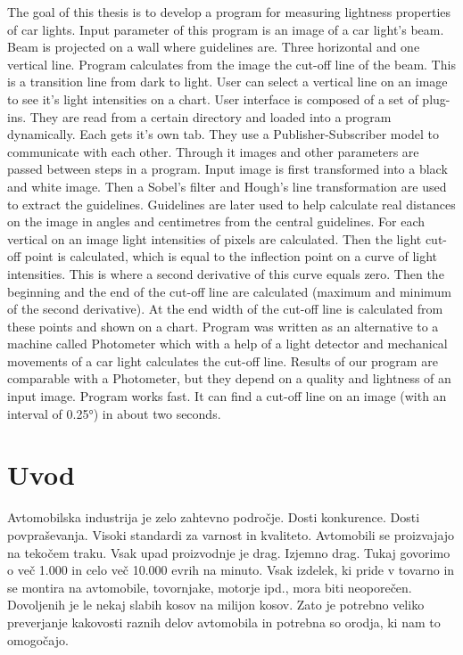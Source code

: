 \documentclass[oneside, a4paper, 12pt]{book}
\newcommand{\clearemptydoublepage}{\newpage{\pagestyle{empty}\cleardoublepage}}
\begin{document}
The goal of this thesis is to develop a program for measuring lightness properties of car lights. Input parameter of this program is an image of a car light's beam. Beam is projected on a wall where guidelines are. Three horizontal and one vertical line. Program calculates from the image the cut-off line of the beam. This is a transition line from dark to light. User can select a vertical line on an image to see it's light intensities on a chart. User interface is composed of a set of plug-ins. They are read from a certain directory and loaded into a program dynamically. Each gets it's own tab. They use a Publisher-Subscriber model to communicate with each other. Through it images and other parameters are passed between steps in a program. Input image is first transformed into a black and white image. Then a Sobel's filter and Hough's line transformation are used to extract the guidelines. Guidelines are later used to help calculate real distances on the image in angles and centimetres from the central guidelines. For each vertical on an image light intensities of pixels are calculated. Then the light cut-off point is calculated, which is equal to the inflection point on a curve of light intensities. This is where a second derivative of this curve equals zero. Then the beginning and the end of the cut-off line are calculated (maximum and minimum of the second derivative). At the end width of the cut-off line is calculated from these points and shown on a chart. Program was written as an alternative to a machine called Photometer which with a help of a light detector and mechanical movements of a car light calculates the cut-off line. Results of our program are comparable with a Photometer, but they depend on a quality and lightness of an input image. Program works fast. It can find a cut-off line on an image (with an interval of 0.25°) in about two seconds.


\renewcommand{\chaptermark}[1]%
{\markboth{\MakeUppercase{\thechapter.\ #1}}{}} \renewcommand{\sectionmark}[1]%
{\markright{\MakeUppercase{\thesection.\ #1}}} \renewcommand{\headrulewidth}{0.5pt} \renewcommand{\footrulewidth}{0pt} 
\fancyhf{}
\fancyhead[LE,RO]{\sl \thepage} \fancyhead[LO]{\sl \rightmark} \fancyhead[RE]{\sl \leftmark}


\clearemptydoublepage

\mainmatter
\setcounter{page}{1}
\pagestyle{fancy}

\chapter{Uvod}
Avtomobilska industrija je zelo zahtevno področje. Dosti konkurence. 
Dosti povpraševanja. Visoki standardi za varnost in kvaliteto. 
Avtomobili se proizvajajo na tekočem traku. Vsak upad proizvodnje 
je drag. Izjemno drag. Tukaj govorimo o več 1.000 in celo več 10.000 
evrih na minuto. Vsak izdelek, ki pride v tovarno in se montira na 
avtomobile, tovornjake, motorje ipd., mora biti neoporečen. Dovoljenih 
je le nekaj slabih kosov na milijon kosov. Zato je potrebno veliko 
preverjanje kakovosti raznih delov avtomobila in potrebna so orodja, 
ki nam to omogočajo.
\end{document}
